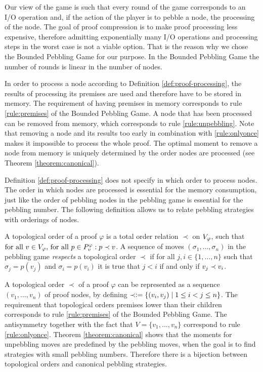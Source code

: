 Our view of the game is such that every round of the game corresponds to an I/O operation and, if the action of the player is to pebble a node, the processing of the node.
The goal of proof compression is to make proof processing less expensive, therefore admitting exponentially many I/O operations and processing steps in the worst case is not a viable option.
That is the reason why we chose the Bounded Pebbling Game for our purpose.
In the Bounded Pebbling Game the number of rounds is linear in the number of nodes.

In order to process a node according to Definition \ref{def:proof-processing}, the results of processing its premises are used and therefore have to be stored in memory.
The requirement of having premises in memory corresponds to rule \ref{rule:premises} of the Bounded Pebbling Game. 
A node that has been processed can be removed from memory, which corresponds to rule \ref{rule:unpebbling}.
Note that removing a node and its results too early in combination with \ref{rule:onlyonce} makes it impossible to process the whole proof.
The optimal moment to remove a node from memory is uniquely determined by the order nodes are processed (see Theorem \ref{theorem:canonical}).

Definition \ref{def:proof-processing} does not specify in which order to process nodes.
The order in which nodes are processed is essential for the memory consumption, just like the order of pebbling nodes in the pebbling game is essential for the pebbling number.
The following definition allows us to relate pebbling strategies with orderings of nodes.

\begin{definition}
\label{def:topological-order}
A topological order of a proof $\varphi$ is a total order relation $\prec$ on $V_{\varphi}$, such that 
$\text{for all } v \in V_{\varphi} \text{, for all } p \in P_{v}^{\varphi}:
p \prec v$.
A sequence of moves $(\sigma_1,\ldots,\sigma_n)$ in the pebbling game \emph{respects} a topological order $\prec$ if for all $j,i \in \{1,\ldots,n\}$ such that $\sigma_j = p(v_j)$ and $\sigma_i = p(v_i)$ it is true that $j < i$ if and only if $v_j \prec v_i$.
\end{definition}

A topological order $\prec$ of a proof $\varphi$ can be represented as a sequence $(v_1,\dots,v_n)$ of proof nodes, by defining $\prec \mathrel{\mathop:}= \{(v_i,v_j) \mid 1 \leq i < j \leq n\}$. 
The requirement that topological orders premises lower than their children corresponds to rule \ref{rule:premises} of the Bounded Pebbling Game.
The antisymmetry together with the fact that $V = \{v_1,\dots,v_n\}$ correspond to rule \ref{rule:onlyonce}.
Theorem \ref{theorem:canonical} shows that the moments for unpebbling moves are predefined by the pebbling moves, when the goal is to find strategies with small pebbling numbers.
Therefore there is a bijection between topological orders and canonical pebbling strategies.

